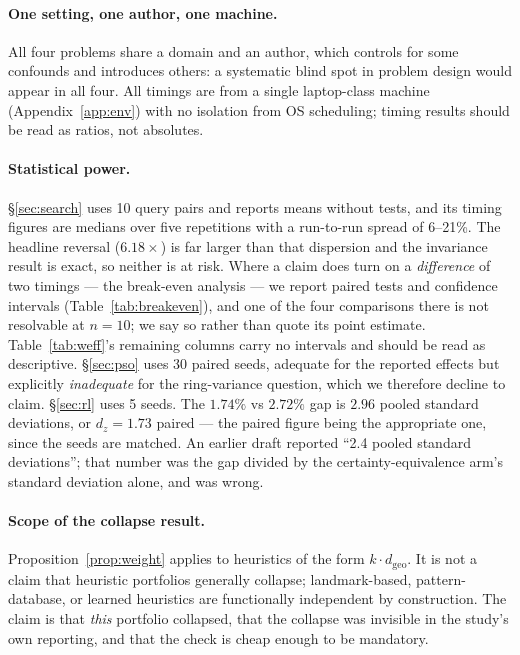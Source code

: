 \documentclass[11pt]{article}
\newcommand{\dgeo}{d_{\mathrm{geo}}}
\begin{document}
\paragraph{One setting, one author, one machine.} All four problems share a domain and an author,
which controls for some confounds and introduces others: a systematic blind spot in problem design
would appear in all four. All timings are from a single laptop-class machine
(Appendix~\ref{app:env}) with no isolation from OS scheduling; timing results should be read as
ratios, not absolutes.

\paragraph{Statistical power.} \S\ref{sec:search} uses 10 query pairs and reports means without
tests, and its timing figures are medians over five repetitions with a run-to-run spread of
6--21\%. The headline reversal ($6.18\times$) is far larger than that dispersion and the invariance
result is exact, so neither is at risk. Where a claim does turn on a \emph{difference} of two
timings --- the break-even analysis --- we report paired tests and confidence intervals
(Table~\ref{tab:breakeven}), and one of the four comparisons there is not resolvable at $n = 10$;
we say so rather than quote its point estimate. Table~\ref{tab:weff}'s remaining columns carry no
intervals and should be read as descriptive. \S\ref{sec:pso} uses 30 paired seeds, adequate for the reported
effects but explicitly \emph{inadequate} for the ring-variance question, which we therefore decline
to claim. \S\ref{sec:rl} uses 5 seeds. The $1.74\%$ vs $2.72\%$ gap is $2.96$ pooled standard deviations, or
$d_z = 1.73$ paired --- the paired figure being the appropriate one, since the seeds are matched.
An earlier draft reported ``2.4 pooled standard deviations''; that number was the gap divided by
the certainty-equivalence arm's standard deviation alone, and was wrong.

\paragraph{Scope of the collapse result.} Proposition~\ref{prop:weight} applies to heuristics of the
form $k \cdot \dgeo$. It is not a claim that heuristic portfolios generally collapse; landmark-based,
pattern-database, or learned heuristics are functionally independent by construction. The claim is
that \emph{this} portfolio collapsed, that the collapse was invisible in the study's own reporting,
and that the check is cheap enough to be mandatory.
\end{document}
